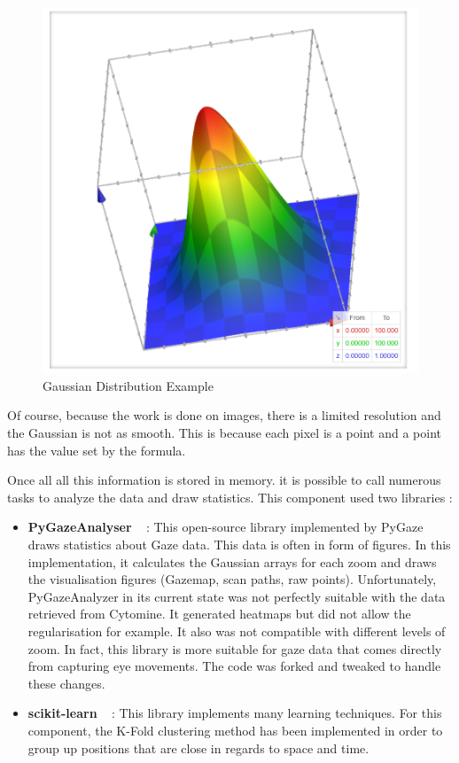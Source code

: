 \documentclass[a4paper,11pt]{report}
\numberwithin{figure}{section} %
\begin{document}
    \begin{figure}[H]
      \centering
      \includegraphics[width=.45\linewidth]{plots/gaussian2D.png}
      \caption{Gaussian Distribution Example}
      \label{fig:gaus22}
    \end{figure}

    Of course, because the work is done on images, there is a limited resolution and the Gaussian is not as smooth.
    This is because each pixel is a point and a point has the value set by the formula.
    \newline

    Once all all this information is stored in memory.
    it is possible to call numerous tasks to analyze the data and draw statistics.
    This component used two libraries :
    \begin{itemize}
        \item[\textbullet] \textbf{PyGazeAnalyser} ~\cite{pygaze} : This open-source library implemented by PyGaze draws statistics about Gaze data.
        This data is often in form of figures.
        In this implementation, it calculates the Gaussian arrays for each zoom and draws the visualisation figures (Gazemap, scan paths, raw points).
        Unfortunately, PyGazeAnalyzer in its current state was not perfectly suitable with the data retrieved from Cytomine.
        It generated heatmaps but did not allow the regularisation for example.
        It also was not compatible with different levels of zoom.
        In fact, this library is more suitable for gaze data that comes directly from capturing eye movements.
        The code was forked and tweaked to handle these changes.
        \item[\textbullet] \textbf{scikit-learn} ~\cite{scikit-learn} : This library implements many learning techniques.
        For this component, the K-Fold clustering method has been implemented in order to group up positions that are close in regards to space and time.
    \end{itemize}
\end{document}
